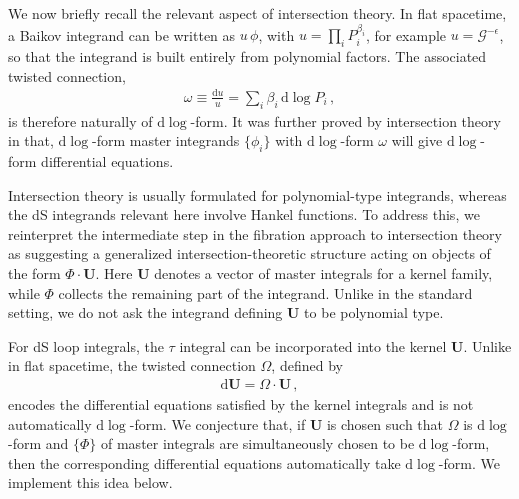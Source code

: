 \documentclass[%
 reprint,
 amsmath,amssymb,
 aps,
prd,
]{revtex4-2}
\def\di{{\mathrm{d}}}
\def\ep{\epsilon}
\newcommand{\mG}{\mathcal{G}}
\begin{document}
We now briefly recall the relevant aspect of intersection theory. In flat spacetime, a Baikov integrand can be written as \(u\,\phi\), with \(u=\prod_i P_i^{\beta_i}\), for example \(u=\mG^{-\ep}\), so that the integrand is built entirely from polynomial factors. The associated twisted connection,
\begin{align}
\omega \equiv \frac{\di u}{u}=\sum_i \beta_i\,\di\log P_i\,,
\end{align}
is therefore naturally of \(\di\log\)-form. It was further proved by intersection theory in \cite{Chen:2023kgw,Chen:2024ovh} that, \(\di\log\)-form  master integrands \(\{\phi_i\}\) with \(\di\log\)-form $\omega$ will give  \(\di\log\)-form differential equations.

Intersection theory is usually formulated for polynomial-type integrands, whereas the dS integrands relevant here involve Hankel functions. To address this, we reinterpret the intermediate step in the fibration approach to intersection theory \cite{Frellesvig:2019uqt} as suggesting a generalized intersection-theoretic structure acting on objects of the form \(\Phi\cdot\mathbf U\). Here \(\mathbf U\) denotes a vector of master integrals for a kernel family, while \(\Phi\) collects the remaining part of the integrand. Unlike in the standard setting, we do not ask the integrand defining \(\mathbf U\) to be polynomial type.

For dS loop integrals, the \(\tau\) integral can be incorporated into the kernel \(\mathbf U\). Unlike in flat spacetime, the twisted connection \(\Omega\), defined by
\begin{align}
\di \mathbf U=\Omega\cdot\mathbf U\,,
\end{align}
encodes the differential equations satisfied by the kernel integrals and is not automatically \(\di\log\)-form. We conjecture that, if \(\mathbf U\) is chosen such that \(\Omega\) is  \(\di\log\)-form and \(\{\Phi\}\) of master integrals are simultaneously chosen to be \(\di\log\)-form, then the corresponding differential equations automatically take \(\di\log\)-form. We implement this idea below.
\end{document}
